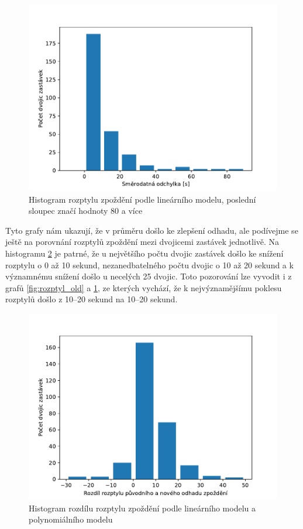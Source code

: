 \begin{figure}
   \centering
 \includegraphics[width=\linewidth]{../img/rozptyl_new}
 \caption{Histogram rozptylu zpoždění podle lineárního modelu, poslední sloupec značí hodnoty 80 a více}
 \label{fig:rozptyl_new}
\end{figure}


\bigbreak


Tyto grafy nám ukazují, že v průměru došlo ke zlepšení odhadu, ale podívejme se ještě na porovnání rozptylů zpoždění mezi dvojicemi zastávek jednotlivě. Na histogramu \ref{fig:rozptyl_diff} je patrné, že u největšího počtu dvojic zastávek došlo ke snížení rozptylu o 0 až 10 sekund, nezanedbatelného počtu dvojic o 10 až 20 sekund a k významnému snížení došlo u necelých 25 dvojic. Toto pozorování lze vyvodit i z grafů \ref{fig:rozptyl_old} a \ref{fig:rozptyl_new}, ze kterých vychází, že k nejvýznamějšímu poklesu rozptylů došlo z 10--20 sekund na 10--20 sekund.


\begin{figure}
   \centering
 \includegraphics[width=1\linewidth]{../img/rozptyl_diff}
 \caption{Histogram rozdílu rozptylu zpoždění podle lineárního modelu a polynomiálního modelu}
 \label{fig:rozptyl_diff}
\end{figure}


